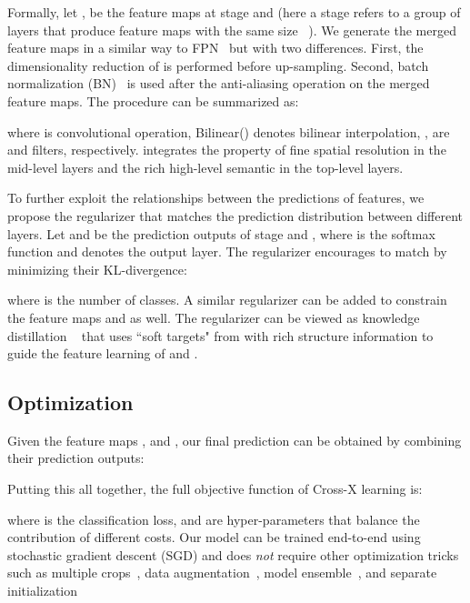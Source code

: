 \documentclass[10pt,twocolumn,letterpaper]{article}
\begin{document}
Formally, let ,  be the feature maps at stage  and  (here a stage refers to a group of layers that produce feature maps with the same size ~\cite{resnet16kaiming}).
We generate the merged feature maps  in a similar way to FPN~\cite{fpn17kaiming} but with two differences.
First, the dimensionality reduction of  is performed before up-sampling.
Second, batch normalization (BN)~\cite{bn15Szegedy} is used after the anti-aliasing operation on the merged feature maps. The procedure can be summarized as:

where  is convolutional operation, Bilinear() denotes bilinear interpolation, ,  are  and  filters, respectively. 
 integrates the property of fine spatial resolution in the mid-level layers and the rich high-level semantic in the top-level layers.

To further exploit the relationships between the predictions of features, we propose the  regularizer that matches the prediction distribution between different layers. Let  and  be the prediction outputs of stage  and , where  is the softmax function and  denotes the output layer. 
The  regularizer encourages  to match  by minimizing their KL-divergence:

where  is the number of classes.
A similar regularizer can be added to constrain the feature maps  and  as well.
The  regularizer can be viewed as knowledge distillation ~\cite{distill15hinton} that uses ``soft targets" from  with rich structure information to guide the feature learning of  and .
 
 

\subsection{Optimization}
\label{sec:fpe}
Given the feature maps ,  and , our final prediction can be obtained by combining their prediction outputs:

Putting this all together, the full objective function of Cross-X learning is:




where  is the classification loss,  and  are hyper-parameters that balance the contribution of different costs.
Our model can be trained end-to-end using stochastic gradient descent (SGD) and does \textit{not} require other optimization tricks such as multiple crops~\cite{ntscnn@eccv}, data augmentation~\cite{kp@cvpr}, model ensemble~\cite{macnn@mei}, and separate initialization~\cite{dfbnet18larry} 
\end{document}
